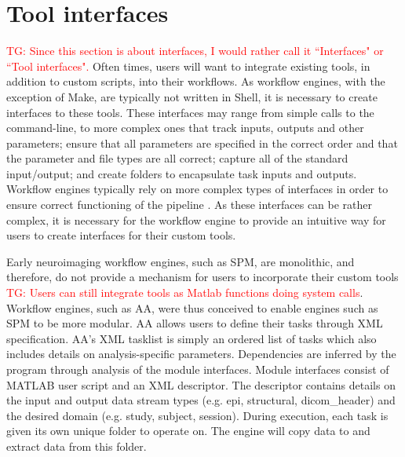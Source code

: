 \documentclass{report}
\newcommand{\tristan}[1]{\textcolor{red}{TG: #1}}
\begin{document}
        \section{Tool interfaces}\label{mod}
            \tristan{Since this section is about interfaces, I would
            rather call it ``Interfaces" or ``Tool interfaces".}
            Often times, users will want to integrate existing tools, in 
            addition to custom scripts, into their workflows. As workflow 
            engines, with the exception of Make, are typically not written in 
            Shell, it is necessary to create interfaces to these tools. These
            interfaces may range from simple calls to the command-line, to more 
            complex ones that track inputs, outputs and other parameters; ensure
            that all parameters are specified in the correct order and that the
            parameter and file types are all correct; capture all of the 
            standard input/output; and create folders to encapsulate task inputs
            and outputs. Workflow engines typically rely on more complex types 
            of interfaces in order to ensure correct functioning of the pipeline
            . As these interfaces can be rather complex, it is necessary for the 
            workflow engine to provide an intuitive way for users to create 
            interfaces for their custom tools.

            Early neuroimaging workflow engines, such as SPM, are monolithic, 
            and therefore, do not provide a mechanism for users to incorporate
            their custom tools \tristan{Users can still integrate tools as Matlab functions
            doing system calls}. Workflow engines, such as AA, were thus 
            conceived to enable engines such as SPM to be more modular. AA 
            allows users to define their tasks through XML specification. AA's 
            XML tasklist is simply an ordered list of tasks which also includes
            details on analysis-specific parameters. Dependencies are
            inferred by the program through analysis of the module interfaces.
            Module interfaces consist of MATLAB user script and an XML 
            descriptor. The descriptor contains details on the input and output
            data stream types (e.g. epi, structural, dicom\_header) 
            and the desired domain (e.g. study, subject, session). During 
            execution, each task is given its own unique folder to operate on. 
            The engine will copy data to and extract data from this folder.
\end{document}
